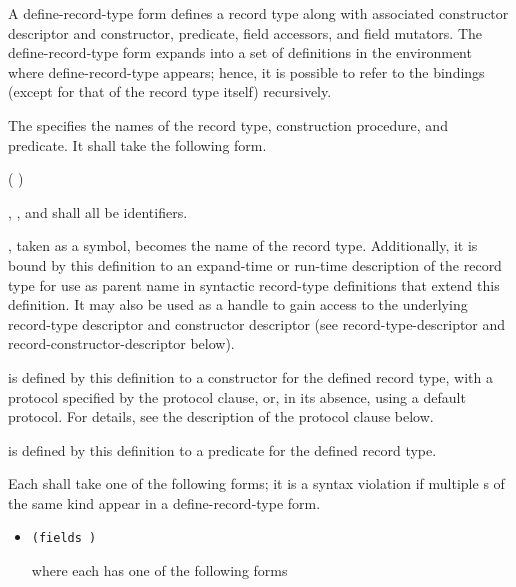 \begin{entry}{%
}

A {\cf define-record-type} form defines a record type along with
associated constructor descriptor and constructor, predicate, field
accessors, and field mutators. The {\cf define-record-type} form expands into
a set of definitions in the environment where {\cf define-record-type}
appears; hence, it is possible to refer to the bindings (except for
that of the record type itself) recursively.

The  specifies the names of the record type,
construction procedure, and predicate. It shall take the following
form.

\begin{scheme}
(  )
\end{scheme}

, , and  shall all be identifiers.

, taken as a symbol, becomes the name of the record
type.  Additionally, it is bound by this definition to an expand-time
or run-time description of the record type for use as parent name in
syntactic record-type definitions that extend this definition. It may
also be used as a handle to gain access to the underlying record-type
descriptor and constructor descriptor (see {\cf
  record-type-descriptor} and {\cf record-constructor-descriptor}
below).

 is defined by this definition to a
constructor for the defined record type, with a protocol specified by
the {\cf protocol} clause, or, in its absence, using a default protocol. For
details, see the description of the {\cf protocol} clause below.

 is defined by this definition to a predicate
for the defined record type.

Each  shall take one of the following forms; it is
a syntax violation if multiple s of the same kind appear in a
{\cf define-record-type} form.

\begin{itemize}
\item {\tt (fields )}
   
  where each  has one of the following forms
  

\end{itemize}
\end{entry}
